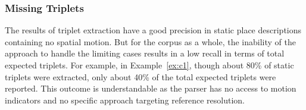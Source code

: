 \documentclass{sig-alternate}
\begin{document}
\subsubsection{Missing Triplets}
\label{missing}
The results of triplet extraction have a good precision in static place descriptions containing no spatial motion. But for the corpus as a whole,
the inability of the approach to handle the limiting cases results in a low recall in terms of total expected triplets. For example, in Example~\ref{ex:c1}, though about 80\% of static triplets were extracted, only about 40\% of the total expected triplets 
were reported. 
This outcome is understandable as the parser has no access to motion indicators and no specific approach targeting reference resolution.
\end{document}
